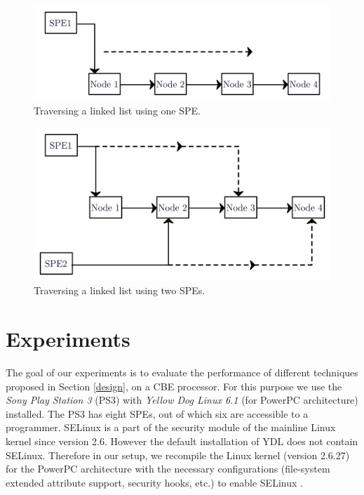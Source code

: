 \documentclass[conference]{IEEEtran}
\begin{document}
\begin{figure}
\includegraphics[scale=0.45]{images/oneSPE.png}
\caption{Traversing a linked list using one SPE.}
\label{figOneSPE}
\vspace{0.05cm}
\end{figure}


\begin{figure}
\includegraphics[scale=0.45]{images/twoSPE.png}
\caption{Traversing a linked list using two SPEs.}
\label{figTwoSPE}
\vspace{0.05cm}
\end{figure}

\section{Experiments}\label{expr}

The goal of our experiments is to evaluate the performance of different techniques proposed in
Section \ref{design}, on a CBE processor. For this purpose we use the
\emph{Sony Play Station 3} (PS3) with \emph{Yellow Dog Linux 6.1} (for
PowerPC architecture) installed. The PS3 has eight SPEs, out of which
six are accessible to a programmer. SELinux is a part of the security module of the
mainline Linux kernel since version 2.6. However the default installation of YDL does not contain
SELinux. Therefore in our setup, we recompile the Linux kernel (version 2.6.27) for the PowerPC architecture 
with the necessary configurations (file-system extended attribute support, security hooks, etc.) to enable SELinux \cite{report}. 
\end{document}
